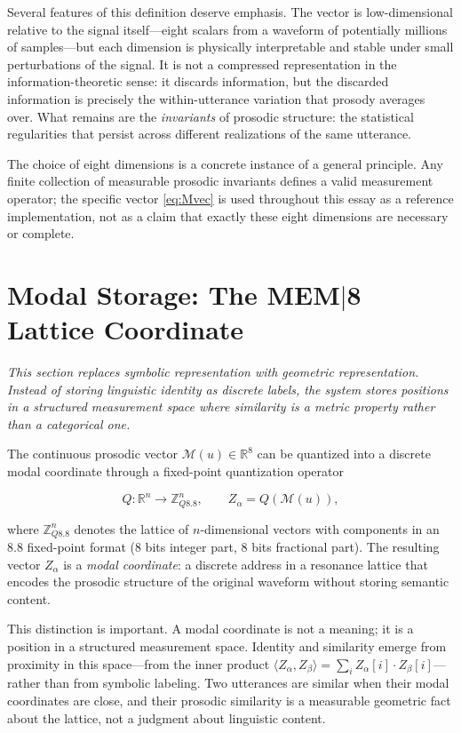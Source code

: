 \documentclass[12pt, a4paper]{article}
\begin{document}
Several features of this definition deserve emphasis. The vector is low-dimensional relative to the signal itself---eight scalars from a waveform of potentially millions of samples---but each dimension is physically interpretable and stable under small perturbations of the signal. It is not a compressed representation in the information-theoretic sense: it discards information, but the discarded information is precisely the within-utterance variation that prosody averages over. What remains are the \emph{invariants} of prosodic structure: the statistical regularities that persist across different realizations of the same utterance.

The choice of eight dimensions is a concrete instance of a general principle. Any finite collection of measurable prosodic invariants defines a valid measurement operator; the specific vector \eqref{eq:Mvec} is used throughout this essay as a reference implementation, not as a claim that exactly these eight dimensions are necessary or complete.

\section{Modal Storage: The MEM$|$8 Lattice Coordinate}

\noindent\textit{This section replaces symbolic representation with geometric representation. Instead of storing linguistic identity as discrete labels, the system stores positions in a structured measurement space where similarity is a metric property rather than a categorical one.}


The continuous prosodic vector $\mathcal{M}(u) \in \mathbb{R}^8$ can be quantized into a discrete modal coordinate through a fixed-point quantization operator

\begin{equation}
Q : \mathbb{R}^n \to \mathbb{Z}_{Q8.8}^n,
\qquad
Z_\alpha = Q(\mathcal{M}(u)),
\label{eq:Q}
\end{equation}

where $\mathbb{Z}_{Q8.8}^n$ denotes the lattice of $n$-dimensional vectors with components in an 8.8 fixed-point format (8 bits integer part, 8 bits fractional part). The resulting vector $Z_\alpha$ is a \emph{modal coordinate}: a discrete address in a resonance lattice that encodes the prosodic structure of the original waveform without storing semantic content.

This distinction is important. A modal coordinate is not a meaning; it is a position in a structured measurement space. Identity and similarity emerge from proximity in this space---from the inner product $\langle Z_\alpha, Z_\beta \rangle = \sum_i Z_\alpha[i] \cdot Z_\beta[i]$---rather than from symbolic labeling. Two utterances are similar when their modal coordinates are close, and their prosodic similarity is a measurable geometric fact about the lattice, not a judgment about linguistic content.
\end{document}
